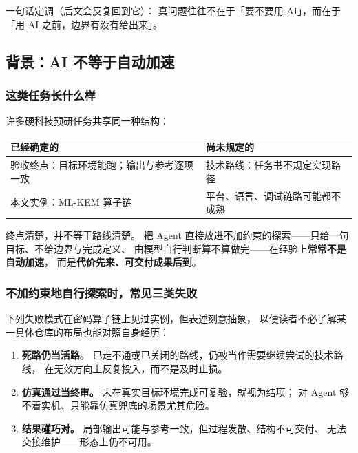 \documentclass[UTF8,a4paper,11pt]{ctexart}
\theoremstyle{definition}
\theoremstyle{plain}
\theoremstyle{remark}
\numberwithin{figure}{section}
\numberwithin{table}{section}
\begin{document}
一句话定调（后文会反复回到它）：
真问题往往不在于「要不要用 AI」，而在于「用 AI 之前，边界有没有给出来」。

\subsection{背景：AI 不等于自动加速}

\subsubsection{这类任务长什么样}

许多硬科技预研任务共享同一种结构：

\begin{center}
\small
\begin{tabular}{@{}L{5.5cm}L{5.5cm}@{}}
  \toprule
  \textbf{已经确定的} & \textbf{尚未规定的} \\
  \midrule
  验收终点：目标环境能跑；输出与参考逐项一致 &
  技术路线：任务书不规定实现路径 \\
  本文实例：ML-KEM 算子链 &
  平台、语言、调试链路可能都不成熟 \\
  \bottomrule
\end{tabular}
\end{center}

终点清楚，并不等于路线清楚。
把 Agent 直接放进不加约束的探索——只给一句目标、不给边界与完成定义、
由模型自行判断算不算做完——在经验上\textbf{常常不是自动加速}，
而是\textbf{代价先来、可交付成果后到}。

\subsubsection{不加约束地自行探索时，常见三类失败}

下列失败模式在密码算子链上见过实例，但表述刻意抽象，
以便读者不必了解某一具体仓库的布局也能对照自身经历：

\begin{enumerate}
  \item \textbf{死路仍当活路。}
        已走不通或已关闭的路线，仍被当作需要继续尝试的技术路线，
        在无效方向上反复投入，而不是及时止损。
  \item \textbf{仿真通过当终审。}
        未在真实目标环境完成可复验，就视为结项；
        对 Agent 够不着实机、只能靠仿真兜底的场景尤其危险。
  \item \textbf{结果碰巧对。}
        局部输出可能与参考一致，但过程发散、结构不可交付、
        无法交接维护——形态上仍不可用。
\end{enumerate}
\end{document}

